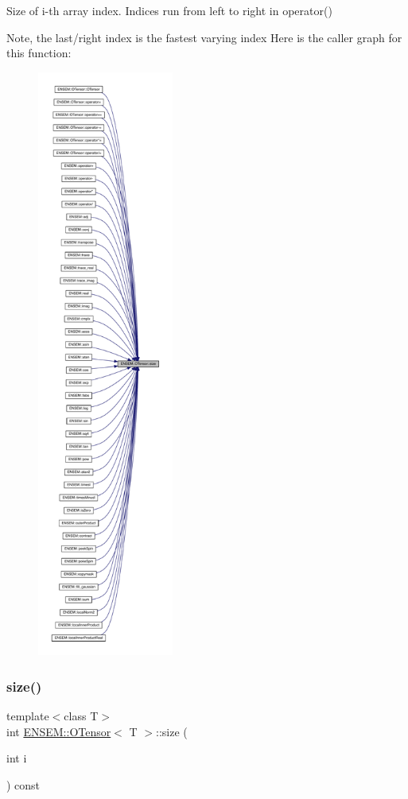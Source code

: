 Size of i-\/th array index. Indices run from left to right in operator() 

Note, the last/right index is the fastest varying index Here is the caller graph for this function\+:\nopagebreak
\begin{figure}[H]
\begin{center}
\leavevmode
\includegraphics[height=550pt]{da/d8a/classENSEM_1_1OTensor_aeb39779caeadcbcea94d9ef629913287_icgraph}
\end{center}
\end{figure}
\mbox{\label{classENSEM_1_1OTensor_aeb39779caeadcbcea94d9ef629913287}} 
\subsubsection{\texorpdfstring{size()}{size()}\hspace{0.1cm}{\footnotesize\ttfamily [2/4]}}
{\footnotesize\ttfamily template$<$class T$>$ \\
int \mbox{\hyperlink{classENSEM_1_1OTensor}{E\+N\+S\+E\+M\+::\+O\+Tensor}}$<$ T $>$\+::size (\begin{DoxyParamCaption}\item[{int}]{i }\end{DoxyParamCaption}) const\hspace{0.3cm}{\ttfamily [inline]}}



